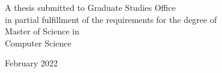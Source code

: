 \documentclass[12pt]{report}
\begin{document}
\begin{latin}
		
		\vspace{3cm}
		\begin{center}
			A thesis submitted to Graduate Studies Office\\
			in partial fulfillment of the requirements for the degree of \\
			Master of Science in\\
			Computer Science
		\end{center}
		
		\begin{center}
			February 2022
		\end{center}
		
		
	\end{latin}
	
\end{document}
